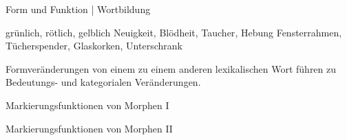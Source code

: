 \begin{frame}
  {Form und Funktion | Wortbildung}
  \pause
  \begin{exe}
    \ex grün\alert{lich}, röt\alert{lich}, gelb\alert{lich}
    \pause
    \ex Neu\alert{igkeit}, Blöd\alert{heit}, Tauch\alert{er}, Heb\alert{ung}
    \pause
    \ex Fenster\alert{rahmen}, Tücher\alert{spender}, Glas\alert{korken}, Unter\alert{schrank}
  \end{exe}
  \pause
  \Zeile
  Formveränderungen von einem zu einem anderen lexikalischen Wort führen zu Bedeutungs- und kategorialen Veränderungen.
\end{frame}

\begin{frame}
  {Markierungsfunktionen von Morphen I}
  \pause
  \begin{exe}
    \ex
    \begin{xlist}
    \end{xlist}
    \pause
    \ex
    \begin{xlist}
    \end{xlist}
  \end{exe}
\end{frame}

\begin{frame}
  {Markierungsfunktionen von Morphen II}
  \pause
  \begin{exe}
    \ex
    \begin{xlist}
    \end{xlist}
  \end{exe}
\end{frame}

